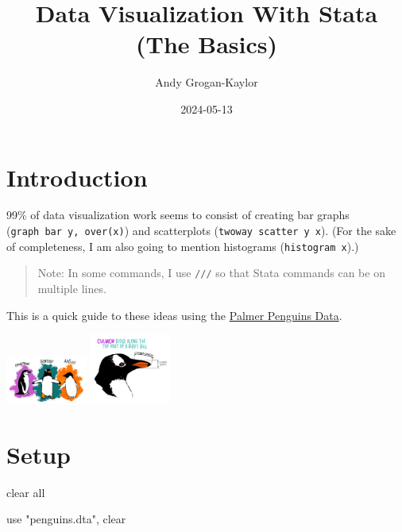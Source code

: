 \documentclass[
  letterpaper,
  DIV=11,
  numbers=noendperiod]{scrartcl}
\title{Data Visualization With Stata (The Basics)}
\author{Andy Grogan-Kaylor}
\date{2024-05-13}
\newenvironment{Shaded}{\begin{snugshade}}{\end{snugshade}}
\newcommand{\KeywordTok}[1]{\textcolor[rgb]{0.00,0.23,0.31}{#1}}
\newcommand{\NormalTok}[1]{\textcolor[rgb]{0.00,0.23,0.31}{#1}}
\newcommand{\OtherTok}[1]{\textcolor[rgb]{0.00,0.23,0.31}{#1}}
\newcommand{\StringTok}[1]{\textcolor[rgb]{0.13,0.47,0.30}{#1}}
\renewcommand*\contentsname{Table of contents}
\newcommand\contentsname{Table of contents}
\begin{document}
\maketitle

\renewcommand*\contentsname{Table of contents}
{
\hypersetup{linkcolor=}
\setcounter{tocdepth}{3}
\tableofcontents
}
\section{Introduction}\label{introduction}

99\% of data visualization work seems to consist of creating bar graphs
(\texttt{graph\ bar\ y,\ over(x)}) and scatterplots
(\texttt{twoway\ scatter\ y\ x}). (For the sake of completeness, I am
also going to mention histograms (\texttt{histogram\ x}).)

\begin{quote}
Note: In some commands, I use \texttt{///} so that Stata commands can be
on multiple lines.
\end{quote}

This is a quick guide to these ideas using the
\href{https://github.com/allisonhorst/palmerpenguins/blob/master/README.md}{Palmer
Penguins Data}.

\includegraphics[width=0.2\textwidth,height=\textheight]{lter_penguins.png}
\includegraphics[width=0.2\textwidth,height=\textheight]{culmen_depth.png}

\section{Setup}\label{setup}

\begin{Shaded}
\begin{Highlighting}[]

\KeywordTok{clear} \OtherTok{all}

\KeywordTok{use} \StringTok{"penguins.dta"}\NormalTok{, }\KeywordTok{clear}
\end{Highlighting}
\end{Shaded}
\end{document}
